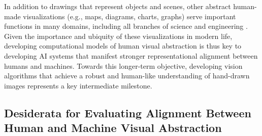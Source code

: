 \documentclass{article}
\begin{document}
In addition to drawings that represent objects and scenes, other abstract human-made visualizations (e.g., maps, diagrams, charts, graphs) serve important functions in many domains, including all branches of science and engineering \cite{tufte1986visual, tversky2000some, hegarty2011cognitive,chen2020foundations, card1999readings}. 
Given the importance and ubiquity of these visualizations in modern life, developing computational models of human visual abstraction is thus key to developing AI systems that manifest stronger representational alignment between humans and machines.  
Towards this longer-term objective, developing vision algorithms that achieve a robust and human-like understanding of hand-drawn images represents a key intermediate milestone.
\vspace{-1 em}

\subsection{Desiderata for Evaluating Alignment Between Human and Machine Visual Abstraction}
\end{document}
